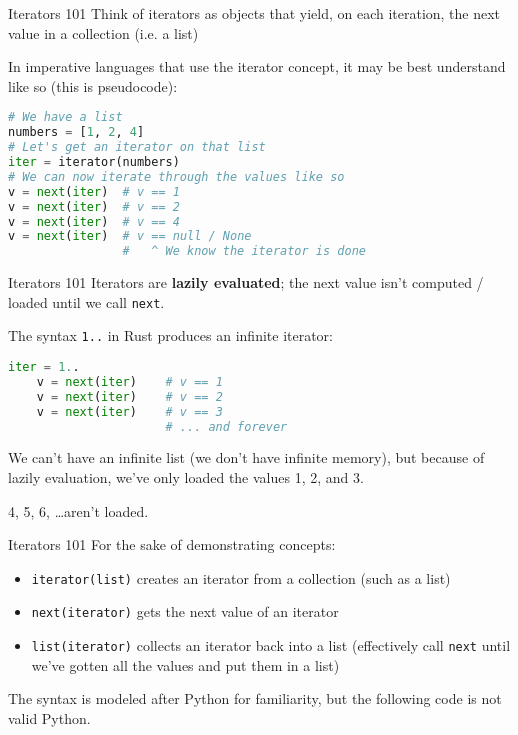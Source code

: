 \documentclass[../index.tex]{subfiles}
\begin{document}
\renewcommand{\currenttitle}{Iterators 101}
\begin{frame}[fragile]{\currenttitle}
  Think of iterators as objects that yield, on each iteration, the next value
  in a collection (i.e. a list)

  In imperative languages that use the iterator concept, it may be best
  understand like so (this is pseudocode): \\[1em]

  \begin{lstlisting}[language=Python]
# We have a list
numbers = [1, 2, 4]
# Let's get an iterator on that list
iter = iterator(numbers)
# We can now iterate through the values like so
v = next(iter)  # v == 1
v = next(iter)  # v == 2
v = next(iter)  # v == 4
v = next(iter)  # v == null / None  
                #   ^ We know the iterator is done
  \end{lstlisting}
\end{frame}

\begin{frame}[fragile]{\currenttitle}
  Iterators are \textbf{lazily evaluated}; the next value isn't computed /
  loaded until we call \texttt{next}.

  The syntax \texttt{1..} in Rust produces an infinite iterator:

  \begin{lstlisting}[language=Python]
    iter = 1..
    v = next(iter)    # v == 1
    v = next(iter)    # v == 2
    v = next(iter)    # v == 3
                      # ... and forever
  \end{lstlisting}

  We can't have an infinite list (we don't have infinite memory), but because of
  lazily evaluation, we've only loaded the values 1, 2, and 3. 

  4, 5, 6, \ldots aren't loaded.
\end{frame}

\begin{frame}[fragile]{\currenttitle}
  For the sake of demonstrating concepts:

  \begin{itemize}
    \item \texttt{iterator(list)} creates an iterator from a collection (such as a
          list)
    \item \texttt{next(iterator)} gets the next value of an iterator
    \item \texttt{list(iterator)} collects an iterator back into a list
          (effectively call \texttt{next} until we've gotten all the values and put
          them in a list)
  \end{itemize}

  \vspace*{2em}
  The syntax is modeled after Python for familiarity, but the following code is
  not valid Python.
\end{frame}
\end{document}

